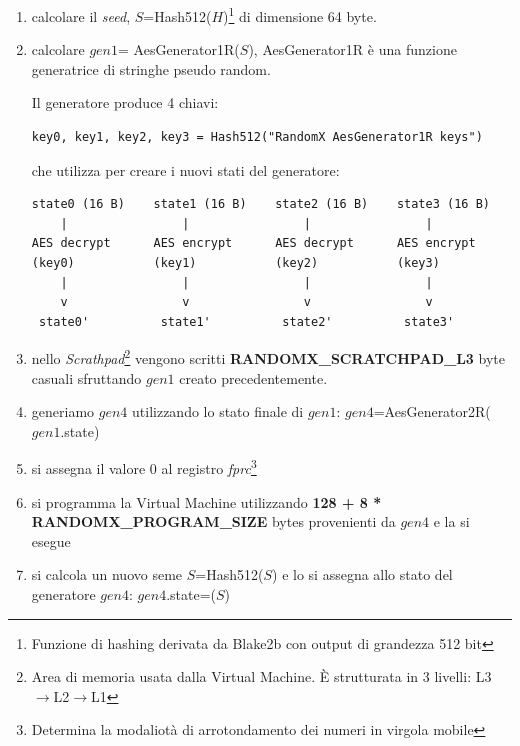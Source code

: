 \documentclass[12pt,a4paper]{article}
\begin{document}
\begin{enumerate}
    \item calcolare il \textit{seed}, $S$=Hash512($H$)\footnote{Funzione di
        hashing derivata da Blake2b con output di grandezza 512 bit} di
        dimensione 64 byte.
    \item calcolare $gen1$= AesGenerator1R($S$), AesGenerator1R è una funzione
        generatrice di stringhe pseudo random. 

        Il generatore produce 4 chiavi:

        \begin{verbatim}
key0, key1, key2, key3 = Hash512("RandomX AesGenerator1R keys")
        \end{verbatim}
        
        che utilizza per creare i nuovi stati del generatore:

        \begin{verbatim}
state0 (16 B)    state1 (16 B)    state2 (16 B)    state3 (16 B)
    |                |                |                |
AES decrypt      AES encrypt      AES decrypt      AES encrypt
(key0)           (key1)           (key2)           (key3)
    |                |                |                |
    v                v                v                v
 state0'          state1'          state2'          state3'
        \end{verbatim}

    \item nello \textit{Scrathpad}\footnote{Area di memoria usata dalla Virtual
    Machine. È strutturata in 3 livelli: L3$\rightarrow$L2$\rightarrow$L1}
    vengono scritti \textbf{RANDOMX\_SCRATCHPAD\_L3} byte casuali sfruttando
    $gen1$ creato precedentemente.

    \item generiamo $gen4$ utilizzando lo stato finale di $gen1$:
    $gen4$=AesGenerator2R($gen1$.state)

    \item si assegna il valore 0 al registro \textit{fprc}\footnote{Determina la
    modaliotà di arrotondamento dei numeri in virgola mobile}

    \item si programma la Virtual Machine utilizzando \textbf{128 + 8 *
    RANDOMX\_PROGRAM\_SIZE} bytes provenienti da $gen4$ e la si esegue

    \item si calcola un nuovo seme $S$=Hash512($S$) e lo si assegna allo stato
    del generatore $gen4$: $gen4$.state=($S$)


\end{enumerate}
\end{document}
